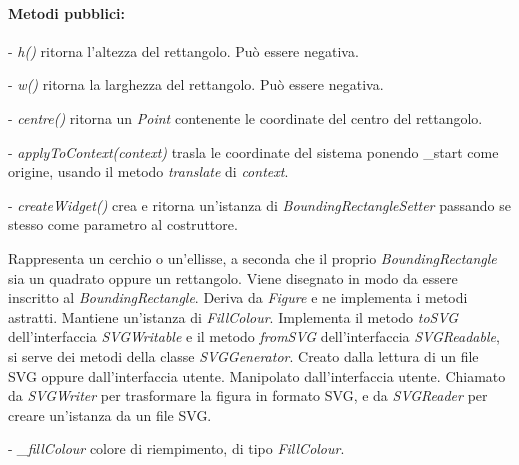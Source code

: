\paragraph{Metodi pubblici:}
\begin{elencopuntato}[\subsubsecindent]
\item[-] \textit{h()} ritorna l'altezza del rettangolo. Pu\`o essere negativa.
\item[-] \textit{w()} ritorna la larghezza del rettangolo. Pu\`o essere negativa.
\item[-] \textit{centre()} ritorna un \textit{Point} contenente le coordinate del centro del rettangolo.
\item[-] \textit{applyToContext(context)} trasla le coordinate del sistema ponendo {\_}start come origine, usando il metodo \textit{translate} di \textit{context}.
\item[-] \textit{createWidget()} crea e ritorna un'istanza di \textit{BoundingRectangleSetter} passando se stesso come parametro al costruttore.
\end{elencopuntato}

Rappresenta un cerchio o un'ellisse, a seconda che il proprio \textit{BoundingRectangle} sia un quadrato oppure un rettangolo. Viene disegnato in modo da essere inscritto al \textit{BoundingRectangle}.
Deriva da \textit{Figure} e ne implementa i metodi astratti. Mantiene un'istanza di \textit{FillColour}. Implementa il metodo \textit{toSVG} dell'interfaccia \textit{SVGWritable} e il metodo \textit{fromSVG} dell'interfaccia \textit{SVGReadable}, si serve dei metodi della classe \textit{SVGGenerator}.
Creato dalla lettura di un file SVG oppure dall'interfaccia utente. Manipolato dall'interfaccia utente. Chiamato da \textit{SVGWriter} per trasformare la figura in formato SVG, e da \textit{SVGReader} per creare un'istanza da un file SVG.
\begin{elencopuntato}[\subsubsecindent]
\item[-] \textit{{\_}fillColour} colore di riempimento, di tipo \textit{FillColour}.
\end{elencopuntato}
